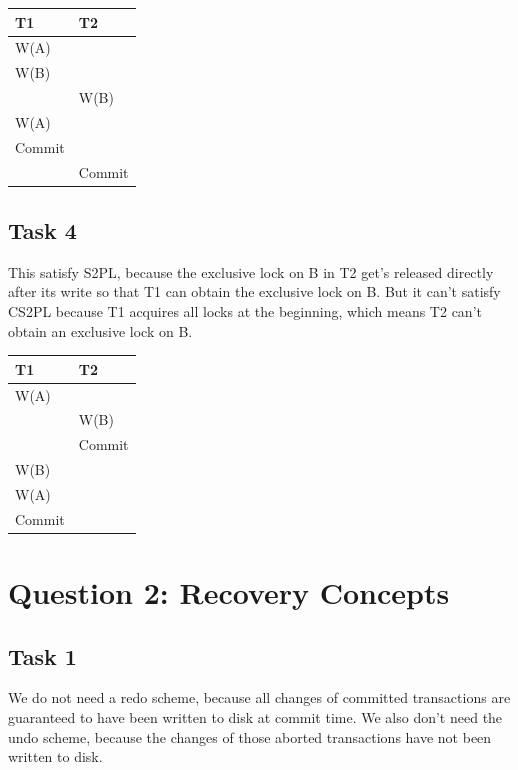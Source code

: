 \documentclass[12pt,a4paper]{article}
\begin{document}
\begin{table}[!htbp]
    \centering
    \begin{tabularx}{\textwidth}{l|l}
        \hline
        T1 & T2 \\ 
        \hline
        W(A)   &  	    \\
        W(B)   & 		\\        
               & W(B)	\\
        W(A)   & 		\\
        Commit & 		\\ 
        	   & Commit	\\      
        \hline
    \end{tabularx}
\end{table}

\subsection{Task 4}
This satisfy S2PL, because the exclusive lock on B in T2 get's released directly after its write so that T1 can obtain the exclusive lock on B.
But it can't satisfy CS2PL because T1 acquires all locks at the beginning, which means T2 can't obtain an exclusive lock on B.

\begin{table}[!htbp]
    \centering
    \begin{tabularx}{\textwidth}{l|l}
        \hline
        T1 & T2 \\ 
        \hline
        W(A)   &  	    \\
               & W(B)	\\
        	   & Commit	\\                         
        W(B)   & 		\\        
        W(A)   & 		\\
        Commit & 		\\     
        \hline
    \end{tabularx}
\end{table}


\section{Question 2: Recovery Concepts}
\subsection{Task 1}
We do not need a redo scheme, because all changes of committed transactions are guaranteed to have been written to disk at commit time.
We also don't need the undo scheme, because the changes of those aborted transactions have not been written to disk.
\end{document}
